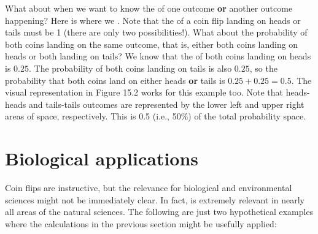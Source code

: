 \documentclass[
  openany]{krantz}
\begin{document}
What about when we want to know the  of one outcome \textbf{or} another outcome happening?
Here is where we .
Note that the  of a coin flip landing on heads or tails must be 1 (there are only two possibilities!).
What about the probability of both coins landing on the same outcome, that is, either both coins landing on heads or both landing on tails?
We know that the  of both coins landing on heads is \(0.25\).
The probability of both coins landing on tails is also \(0.25\), so the probability that both coins land on either heads \textbf{or} tails is \(0.25 + 0.25 = 0.5\).
The visual representation in Figure 15.2 works for this example too.
Note that heads-heads and tails-tails outcomes are represented by the lower left and upper right areas of  space, respectively.
This is 0.5 (i.e., 50\%) of the total probability space.

\hypertarget{biological-applications}{%
\section{Biological applications}\label{biological-applications}}

Coin flips are instructive, but the relevance for biological and environmental sciences might not be immediately clear.
In fact,  is extremely relevant in nearly all areas of the natural sciences.
The following are just two hypothetical examples where the calculations in the previous section might be usefully applied:
\end{document}
